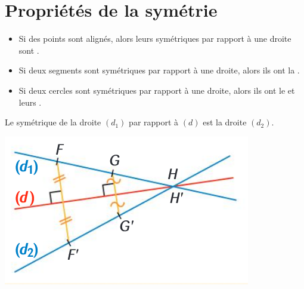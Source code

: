 \documentclass[xcolor={dvipsnames}]{beamer}
\begin{document}
\section{Propriétés de la symétrie}


\begin{frame}
	\begin{myprops}
		\begin{itemize}
				\item Si des points sont alignés, alors leurs symétriques par rapport à une droite sont .\pause
				\item Si deux segments sont symétriques par rapport à une droite, alors ils ont la .\pause
				\item Si deux cercles sont symétriques par rapport à une droite, alors ils ont le  et leurs .\pause
		\end{itemize}
		
	\end{myprops}

	\begin{myexs}
		Le symétrique de la droite $(d_1)$ par rapport à $(d)$ est la droite $(d_2)$.
	

		\begin{center}
			\includegraphics[scale=0.4]{prop1}
		\end{center}
	\end{myexs}
\end{frame}
\end{document}
